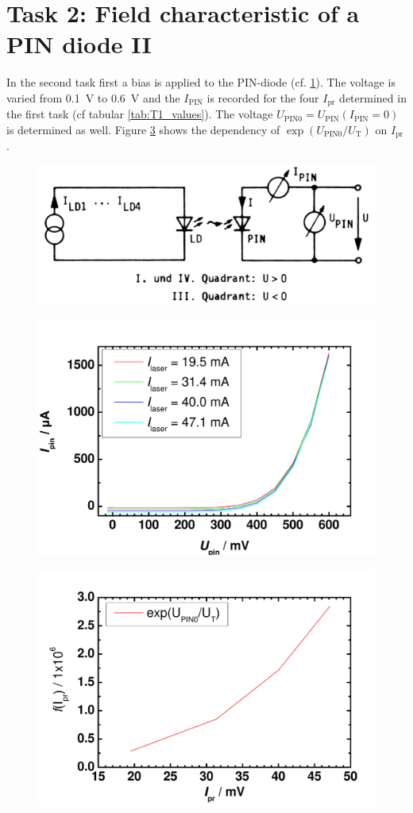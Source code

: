 \section{Task 2: Field characteristic of a PIN diode II}

In the second task first a bias is applied to the PIN-diode (cf. \ref{fig:T2_setup}). The voltage is varied from 0.1~V to 0.6~V and the $I_{\mathrm{PIN}}$ is recorded for the four $I_{\mathrm{pr}}$ determined in the first task (cf tabular \ref{tab:T1_values}). The voltage $U_{\mathrm{PIN0}} = U_{\mathrm{PIN}}(I_{\mathrm{PIN}}=0)$ is determined as well. Figure \ref{fig:UPIN0} shows the dependency of $\exp(U_{\mathrm{PIN0}}/U_{\mathrm{T}})$ on $I_{\mathrm{pr}}$.

 


\begin{figure}%
\centering
\includegraphics[width=.6\columnwidth]{Grafiken/T2_setup.jpg}%
\caption{}%
\label{fig:T2_setup}%
\end{figure}

\begin{figure}%
\centering
\includegraphics[width=.6\columnwidth]{Grafiken/PIN_kombiniert.pdf}%
\caption{}%
\label{fig:PIN_kombiniert}%
\end{figure}
\begin{figure}%
\centering
\includegraphics[width=.6\columnwidth]{Grafiken/UPIN0.pdf}%
\caption{}%
\label{fig:UPIN0}%
\end{figure}

